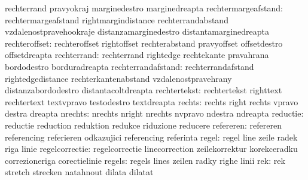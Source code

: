                            rechterrand               pravyokraj
                           marginedestro             marginedreapta
      rechtermargeafstand: rechtermargeafstand       rightmargindistance
                           rechterrandabstand        vzdalenostpravehookraje
                           distanzamarginedestro     distantamarginedreapta
            rechteroffset: rechteroffset             rightoffset
                           rechterabstand            pravyoffset
                           offsetdestro              offsetdreapta
              rechterrand: rechterrand               rightedge
                           rechtekante               pravahrana
                           bordodestro               borduradreapta
       rechterrandafstand: rechterrandafstand        rightedgedistance
                           rechterkantenabstand      vzdalenostpravehrany
                           distanzabordodestro       distantacoltdreapta
             rechtertekst: rechtertekst              righttext
                           rechtertext               textvpravo
                           testodestro               textdreapta %
                   rechts: rechts                    right
                           rechts                    vpravo
                           destra                    dreapta
                  nrechts: nrechts                   nright
                           nrechts                   nvpravo
                           ndestra                   ndreapta
                 reductie: reductie                  reduction
                           reduktion                 redukce
                           riduzione                 reducere
                refereren: refereren                 referencing
                           referieren                odkazujici
                           referencing               referinta %
                    regel: regel                     line
                           zeile                     radek
                           riga                      linie
           regelcorrectie: regelcorrectie            linecorrection
                           zeilekorrektur            korekceradku
                           correzioneriga            corectielinie
                   regels: regels                    lines
                           zeilen                    radky
                           righe                     linii
                      rek: rek                       stretch
                           strecken                  natahnout
                           dilata                    dilatat %
